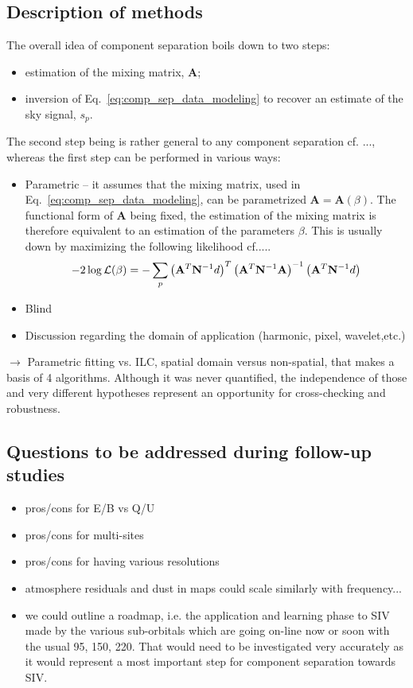 \subsection{Description of methods}
The overall idea of component separation boils down to two steps:
\begin{itemize}
	\item estimation of the mixing matrix, $\mathbf{A}$;
	\item inversion of Eq.~\ref{eq:comp_sep_data_modeling} to recover an estimate of the sky signal, $s_p$.
\end{itemize}
The second step being is rather general to any component separation cf. ..., whereas the first step can be performed in various ways:
\begin{itemize}
	\item Parametric -- it assumes that the mixing matrix, used in Eq.~\ref{eq:comp_sep_data_modeling}, can be parametrized $\mathbf{A} = \mathbf{A}(\beta)$. The functional form of $\mathbf{A}$ being fixed, the estimation of the mixing matrix is therefore equivalent to an estimation of the parameters $\beta$. This is usually down by maximizing the following likelihood cf.....
	\begin{eqnarray}
		\centering
			-2\log \mathcal{L}(\beta) = - \sum_p \left( \mathbf{A}^T\mathbf{N}^{-1} d\right)^T\left( \mathbf{A}^T\mathbf{N}^{-1} \mathbf{A}\right)^{-1}\left( \mathbf{A}^T\mathbf{N}^{-1} d\right)
	\end{eqnarray}
	\item Blind
	\item Discussion regarding the domain of application (harmonic, pixel, wavelet,etc.)
\end{itemize}

$\rightarrow$ Parametric fitting vs. ILC, spatial domain versus
non-spatial, that makes a basis of 4 algorithms. Although it was never
quantified, the independence of those and very different hypotheses represent
an opportunity for cross-checking and robustness.

\subsection{Questions to be addressed during follow-up studies}
\begin{itemize}
	\item pros/cons for E/B vs Q/U
	\item pros/cons for multi-sites
	\item pros/cons for having various resolutions
	\item atmosphere residuals and dust in maps could scale similarly with frequency...
	\item we could outline a roadmap, i.e. the application and learning phase to SIV made by the various sub-orbitals which are going on-line now or soon with the usual 95, 150, 220. That would need to be investigated very accurately as it would represent a most important step for component separation
towards SIV.
\end{itemize}





%



